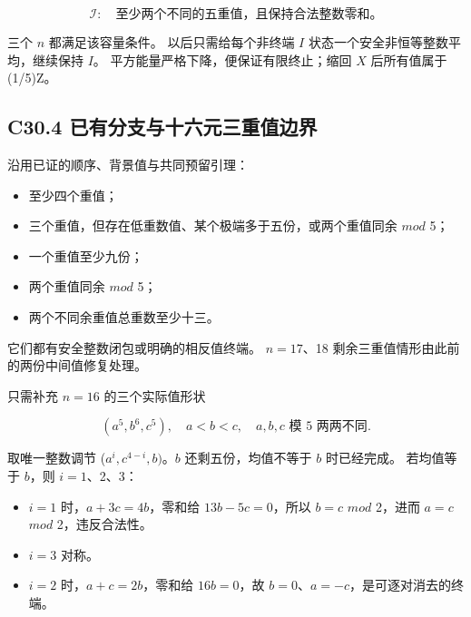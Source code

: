 \[
\mathcal I:\quad\text{至少两个不同的五重值，且保持合法整数零和。}
\]

{三个} {\ensuremath{n}} {都满足该容量条件。} {以后只需给每个非终端} {\ensuremath{I}} {状态一个安全非恒等整数平均，继续保持} {\ensuremath{I}。} {平方能量严格下降，便保证有限终止；缩回} {\ensuremath{X}} {后所有值属于} {(1/5)Z。}

\subsection*{\texorpdfstring{{C30.4} {已有分支与十六元三重值边界}}{C30.4 已有分支与十六元三重值边界}}\label{C30-h194}

{沿用已证的顺序、背景值与共同预留引理：}

\begin{itemize}
\tightlist
\item
  {至少四个重值；}
\item
  {三个重值，但存在低重数值、某个极端多于五份，或两个重值同余} {\ensuremath{mod}} {5；}
\item
  {一个重值至少九份；}
\item
  {两个重值同余} {\ensuremath{mod}} {5；}
\item
  {两个不同余重值总重数至少十三。}
\end{itemize}

{它们都有安全整数闭包或明确的相反值终端。} {\ensuremath{n=17}、18} {剩余三重值情形由此前的两份中间值修复处理。}

{只需补充} {\ensuremath{n=16}} {的三个实际值形状}

\[
(a^5,b^6,c^5),\quad a<b<c,
\quad a,b,c\text{ 模 5 两两不同}.
\]

{取唯一整数调节} {(\ensuremath{a^{i},c^{4-i},b)}。\ensuremath{b}} {还剩五份，均值不等于} {\ensuremath{b}} {时已经完成。} {若均值等于} {\ensuremath{b}，则} {\ensuremath{i=1}、2、3：}

\begin{itemize}
\tightlist
\item
  {\ensuremath{i=1}} {时，\ensuremath{a+3c=4b}，零和给} {\ensuremath{13b-5c=0}，所以} {\ensuremath{b=c}} {\ensuremath{mod}} {2，进而} {\ensuremath{a=c}} {\ensuremath{mod}} {2，违反合法性。}
\item
  {\ensuremath{i=3}} {对称。}
\item
  {\ensuremath{i=2}} {时，\ensuremath{a+c=2b}，零和给} {\ensuremath{16b=0}，故} {\ensuremath{b=0}、\ensuremath{a=-c}，是可逐对消去的终端。}
\end{itemize}

